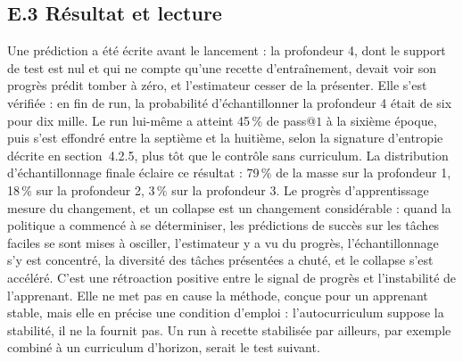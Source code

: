 \documentclass[11pt,a4paper]{article}
\begin{document}
\subsection*{E.3 Résultat et lecture}
Une prédiction a été écrite avant le lancement : la profondeur 4, dont le support de test est nul et qui ne compte qu'une recette d'entraînement, devait voir son progrès prédit tomber à zéro, et l'estimateur cesser de la présenter. Elle s'est vérifiée : en fin de run, la probabilité d'échantillonner la profondeur 4 était de six pour dix mille. Le run lui-même a atteint 45\,\% de pass@$1$ à la sixième époque, puis s'est effondré entre la septième et la huitième, selon la signature d'entropie décrite en section~4.2.5, plus tôt que le contrôle sans curriculum. La distribution d'échantillonnage finale éclaire ce résultat : 79\,\% de la masse sur la profondeur 1, 18\,\% sur la profondeur 2, 3\,\% sur la profondeur 3. Le progrès d'apprentissage mesure du changement, et un collapse est un changement considérable : quand la politique a commencé à se déterminiser, les prédictions de succès sur les tâches faciles se sont mises à osciller, l'estimateur y a vu du progrès, l'échantillonnage s'y est concentré, la diversité des tâches présentées a chuté, et le collapse s'est accéléré. C'est une rétroaction positive entre le signal de progrès et l'instabilité de l'apprenant. Elle ne met pas en cause la méthode, conçue pour un apprenant stable, mais elle en précise une condition d'emploi : l'autocurriculum suppose la stabilité, il ne la fournit pas. Un run à recette stabilisée par ailleurs, par exemple combiné à un curriculum d'horizon, serait le test suivant.
\end{document}
